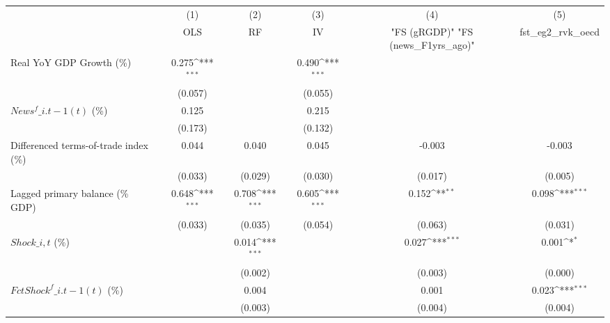 {
\def\sym#1{\ifmmode^{#1}\else\(^{#1}\)\fi}
\begin{tabular}{l*{5}{c}}
\toprule
                    &\multicolumn{1}{c}{(1)}&\multicolumn{1}{c}{(2)}&\multicolumn{1}{c}{(3)}&\multicolumn{1}{c}{(4)}&\multicolumn{1}{c}{(5)}\\
                    &\multicolumn{1}{c}{OLS}&\multicolumn{1}{c}{RF}&\multicolumn{1}{c}{IV}&\multicolumn{1}{c}{ "FS (gRGDP)"  "FS (news\_F1yrs\_ago)" }&\multicolumn{1}{c}{fst\_eg2\_rvk\_oecd}\\
\midrule
Real YoY GDP Growth (\%)&       0.275\sym{***}&                     &       0.490\sym{***}&                     &                     \\
                    &     (0.057)         &                     &     (0.055)         &                     &                     \\
\addlinespace
$ News^f\_{i.t-1}(t)$ (\%)&       0.125         &                     &       0.215         &                     &                     \\
                    &     (0.173)         &                     &     (0.132)         &                     &                     \\
\addlinespace
Differenced terms-of-trade index (\%)&       0.044         &       0.040         &       0.045         &      -0.003         &      -0.003         \\
                    &     (0.033)         &     (0.029)         &     (0.030)         &     (0.017)         &     (0.005)         \\
\addlinespace
Lagged primary balance (\% GDP)&       0.648\sym{***}&       0.708\sym{***}&       0.605\sym{***}&       0.152\sym{**} &       0.098\sym{***}\\
                    &     (0.033)         &     (0.035)         &     (0.054)         &     (0.063)         &     (0.031)         \\
\addlinespace
$ Shock\_{i,t}$ (\%) &                     &       0.014\sym{***}&                     &       0.027\sym{***}&       0.001\sym{*}  \\
                    &                     &     (0.002)         &                     &     (0.003)         &     (0.000)         \\
\addlinespace
$ FctShock^f\_{i.t-1}(t)$ (\%)&                     &       0.004         &                     &       0.001         &       0.023\sym{***}\\
                    &                     &     (0.003)         &                     &     (0.004)         &     (0.004)         \\

\end{tabular}}
